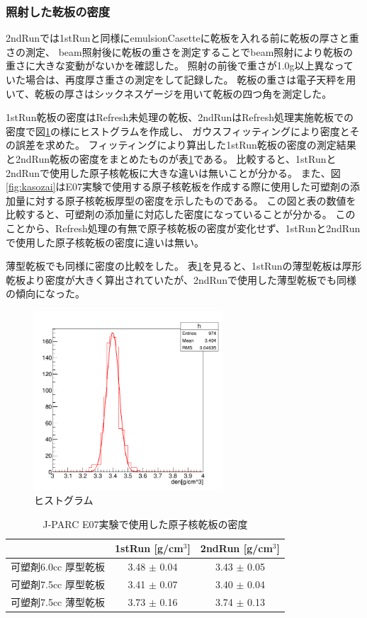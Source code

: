 \documentclass[12pt,a4paper]{jarticle}
\begin{document}
\subsubsection{照射した乾板の密度}
2ndRunでは1stRunと同様にemulsionCasetteに乾板を入れる前に乾板の厚さと重さの測定、
beam照射後に乾板の重さを測定することでbeam照射により乾板の重さに大きな変動がないかを確認した。
照射の前後で重さが1.0g以上異なっていた場合は、再度厚さ重さの測定をして記録した。
乾板の重さは電子天秤を用いて、乾板の厚さはシックネスゲージを用いて乾板の四つ角を測定した。
\par
1stRun乾板の密度はRefresh未処理の乾板、2ndRunはRefresh処理実施乾板での密度で図\ref{fig:hisuto}の様にヒストグラムを作成し、
ガウスフィッティングにより密度とその誤差を求めた。
フィッティングにより算出した1stRun乾板の密度の測定結果と2ndRun乾板の密度をまとめたものが表\ref{tab:compare_E07_12}である。
比較すると、1stRunと2ndRunで使用した原子核乾板に大きな違いは無いことが分かる。
また、図\ref{fig:kasozai}はE07実験で使用する原子核乾板を作成する際に使用した可塑剤の添加量に対する原子核乾板厚型の密度を示したものである。
この図と表の数値を比較すると、可塑剤の添加量に対応した密度になっていることが分かる。
このことから、Refresh処理の有無で原子核乾板の密度が変化せず、1stRunと2ndRunで使用した原子核乾板の密度に違いは無い。
\par
薄型乾板でも同様に密度の比較をした。
表\ref{tab:compare_E07_12}を見ると、1stRunの薄型乾板は厚形乾板より密度が大きく算出されていたが、2ndRunで使用した薄型乾板でも同様の傾向になった。
\begin{figure}[htbp]
  \centering
     \includegraphics[width=70mm]{thick75_den.png}
  \caption{ヒストグラム\label{fig:hisuto}}
\end{figure}
\begin{table}[htbp]
  \centering
  \caption{J-PARC E07実験で使用した原子核乾板の密度\label{tab:compare_E07_12}}
  \begin{tabular}{c|c|c}
  　　　&1stRun [g/cm$^3$]&2ndRun [g/cm$^3$]\\
  \hline
  \hline
  可塑剤6.0cc 厚型乾板 & 3.48 $\pm$ 0.04 & 3.43 $\pm$ 0.05 \\
  可塑剤7.5cc 厚型乾板 & 3.41 $\pm$ 0.07 & 3.40 $\pm$ 0.04 \\
  可塑剤7.5cc 薄型乾板 & 3.73 $\pm$ 0.16 & 3.74 $\pm$ 0.13 \\
  \hline
  \end{tabular}
\end{table}
\end{document}
